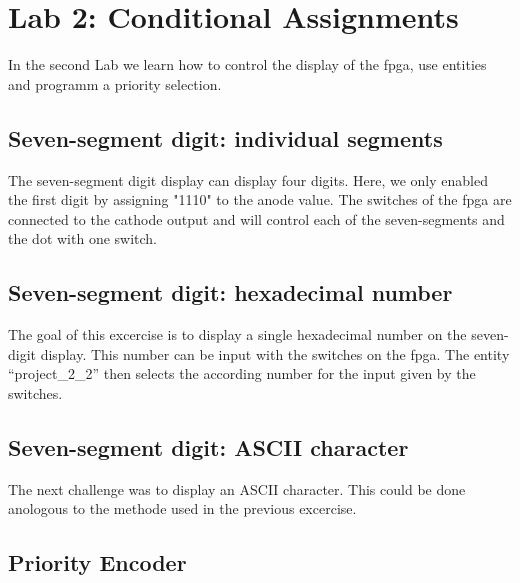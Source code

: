 \chapter{Lab 2: Conditional Assignments} \label{day2}

In the second Lab we learn how to control the display of the \gls{fpga}, use entities and programm a priority selection.

\section{Seven-segment digit: individual segments}

The seven-segment digit display can display four digits. Here, we only enabled the first digit by assigning "1110" to the anode value. The switches of the \gls{fpga} are connected to the cathode output and will control each of the seven-segments and the dot with one switch. 



\section{Seven-segment digit: hexadecimal number}

The goal of this excercise is to display a single hexadecimal number on the seven-digit display. This number can be input with the switches on the \gls{fpga}. The entity ``project\_2\_2'' then selects the according number for the input given by the switches. 





\section{Seven-segment digit: ASCII character}

The next challenge was to display an ASCII character. This could be done anologous to the methode used in the previous excercise.





\section{Priority Encoder}

